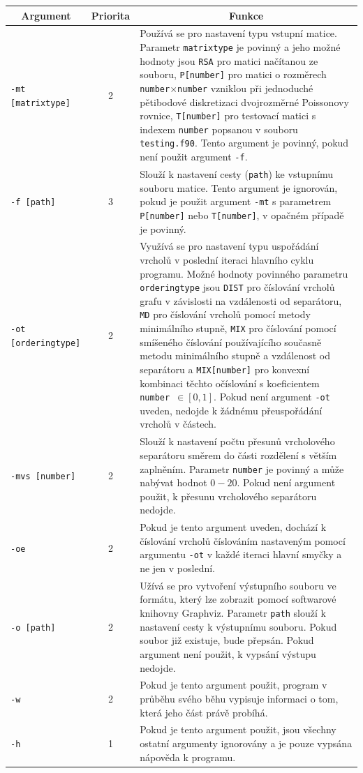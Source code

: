 \documentclass{ctuthesis}
\theoremstyle{plain}
\theoremstyle{definition}
\begin{document}
\bigskip
{\noindent
\footnotesize
  \centering
  \renewcommand{\arraystretch}{1.15}
\begin{tabular}{|l|c|p{10cm}|}
  \hline
  \multicolumn{1}{|c|}{Argument}    & \multicolumn{1}{c|}{Priorita} & \multicolumn{1}{c|}{Funkce} \\
  \hline
  \texttt{-mt [matrixtype]}  & 2 & Používá se pro nastavení typu vstupní matice. Parametr \texttt{matrixtype} je povinný a jeho možné hodnoty jsou \texttt{RSA} pro matici načítanou ze souboru, \texttt{P[number]} pro matici o rozměrech \texttt{number}$\times$\texttt{number} vzniklou při jednoduché pětibodové diskretizaci dvojrozměrné Poissonovy rovnice, \texttt{T[number]} pro testovací matici s indexem \texttt{number} popsanou v souboru \texttt{testing.f90}. Tento argument je povinný, pokud není použit argument \texttt{-f}. \\
  \texttt{-f [path]}& 3 & Slouží k nastavení cesty (\texttt{path}) ke vstupnímu souboru matice. Tento argument je ignorován, pokud je použit argument \texttt{-mt} s parametrem \texttt{P[number]} nebo \texttt{T[number]}, v opačném případě je povinný.\\
  \texttt{-ot [orderingtype]}& 2 & Využívá se pro nastavení typu uspořádání vrcholů v poslední iteraci hlavního cyklu programu. Možné hodnoty povinného parametru \texttt{orderingtype} jsou \texttt{DIST} pro číslování vrcholů grafu v závislosti na vzdálenosti od separátoru, \texttt{MD} pro číslování vrcholů pomocí metody minimálního stupně, \texttt{MIX} pro číslování pomocí smíšeného číslování používajícího současně metodu minimálního stupně a vzdálenost od separátoru a \texttt{MIX[number]} pro konvexní kombinaci těchto očíslování s koeficientem \texttt{number}~$ \in [0,1]$. Pokud není argument \texttt{-ot} uveden, nedojde k žádnému přeuspořádání vrcholů v částech. \\
  \texttt{-mvs [number]}& 2 & Slouží k nastavení počtu přesunů vrcholového separátoru směrem do části rozdělení s větším zaplněním. Parametr \texttt{number} je povinný a může nabývat hodnot $0 - 20$. Pokud není argument použit, k přesunu vrcholového separátoru nedojde. \\
  \texttt{-oe}& 2 & Pokud je tento argument uveden, dochází k číslování vrcholů číslováním nastaveným pomocí argumentu \texttt{-ot} v každé iteraci hlavní smyčky a ne jen v poslední.\\
  \texttt{-o [path]}& 2 & Užívá se pro vytvoření výstupního souboru ve formátu, který lze zobrazit pomocí softwarové knihovny Graphviz. Parametr \texttt{path} slouží k nastavení cesty k výstupnímu souboru. Pokud soubor již existuje, bude přepsán. Pokud argument není použit, k vypsání výstupu nedojde.\\
  \texttt{-w}& 2 & Pokud je tento argument použit, program v průběhu svého běhu vypisuje informaci o tom, která jeho část právě probíhá. \\
  \texttt{-h}& 1 & Pokud je tento argument použit, jsou všechny ostatní argumenty ignorovány a je pouze vypsána nápověda k programu. \\
  \hline
\end{tabular}
}
\end{document}
